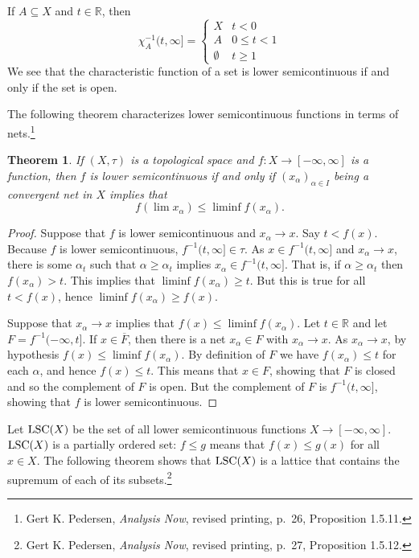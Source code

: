 \documentclass{article}
\newcommand{\LSC}{\ensuremath\mathrm{LSC}}
\newtheorem{theorem}{Theorem}
\theoremstyle{definition}
\begin{document}
If $A \subseteq X$ and $t \in \mathbb{R}$, then
\[
\chi_A^{-1}(t,\infty]=\begin{cases}
X&t < 0\\
A&0 \leq t< 1\\
\emptyset&t\geq1
\end{cases}
\]
We see that the characteristic function of a set is lower semicontinuous if and only if the set is open.

The following theorem characterizes lower semicontinuous functions in terms of nets.\footnote{Gert K. Pedersen,
{\em Analysis Now}, revised printing, p.~26, Proposition 1.5.11.}

\begin{theorem}
If $(X,\tau)$ is a topological space and $f:X \to [-\infty,\infty]$ is a function, then $f$ is lower semicontinuous if and only if 
 $(x_\alpha)_{\alpha \in I}$ being a convergent net in $X$ implies that 
\[
f(\lim x_\alpha) \leq \liminf f(x_\alpha).
\]
\label{liminf}
\end{theorem}
\begin{proof}
Suppose that  $f$ is lower semicontinuous and $x_\alpha \to x$. Say  $t<f(x)$.  Because $f$ is lower semicontinuous,
$f^{-1}(t,\infty] \in \tau$. As $x \in f^{-1}(t,\infty]$ and $x_\alpha \to x$, there is some $\alpha_t$ such that 
$\alpha \geq \alpha_t$ implies $x_\alpha \in  f^{-1}(t,\infty]$. That is, if $\alpha \geq \alpha_t$ then
$f(x_\alpha)>t$. This implies that $\liminf f(x_\alpha) \geq t$. But this is true for all $t<f(x)$, hence
$\liminf f(x_\alpha) \geq f(x)$.

Suppose that $x_\alpha \to x$ implies that $f(x) \leq \liminf f(x_\alpha)$. Let $t \in \mathbb{R}$ and let $F=f^{-1}(-\infty,t]$. 
If $x \in \overline{F}$, then there is a net $x_\alpha \in F$ with $x_\alpha \to x$. 
As $x_\alpha \to x$, by hypothesis
$f(x) \leq \liminf f(x_\alpha)$.
By definition of $F$ we have $f(x_\alpha) \leq t$ for each $\alpha$, and hence $f(x) \leq t$.
This means that
$x \in F$, showing that $F$ is closed and so the complement of $F$ is open. But the complement of $F$ is 
$f^{-1}(t,\infty]$, showing that $f$ is lower semicontinuous.
\end{proof}

Let $\LSC(X)$ be the set of all lower semicontinuous functions $X \to [-\infty,\infty]$. $\LSC(X)$ is a partially ordered set:
$f \leq g$ means that $f(x) \leq g(x)$ for all $x \in X$. The following theorem shows that $\LSC(X)$ is a  lattice that contains the supremum of each of its subsets.\footnote{Gert K. Pedersen, {\em Analysis Now}, revised printing, p.~27, Proposition 1.5.12.} 
\end{document}
